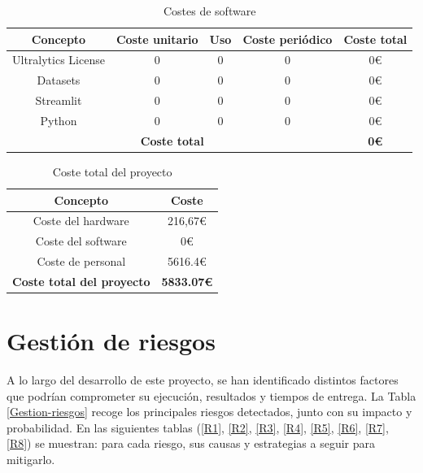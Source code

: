\documentclass[12pt,a4paper,onecolumn,oneside]{report}
\begin{document}
\begin{table}[ht]
    \centering
    \caption{Costes de software}
    \begin{tabular}{|c|c|c|c|c|}
        \hline
        \textbf{Concepto} & \textbf{Coste unitario} & \textbf{Uso} & \textbf{Coste periódico} & \textbf{Coste total}\\
        \hline
        Ultralytics License & 0 & 0 & 0 & 0€\\
        \hline
        Datasets & 0 & 0 & 0 & 0€\\
        \hline
        Streamlit & 0 & 0 & 0 & 0€\\
        \hline
        Python & 0 & 0 & 0 & 0€\\
        \hline
        \multicolumn{4}{|c|}{\textbf{Coste total}} & \textbf{0€}\\
        \hline
    \end{tabular}
    \label{Coste-SW}
\end{table}

\begin{table}[ht]
    \centering
    \caption{Coste total del proyecto}
    \begin{tabular}{|c|c|}
        \hline
        \textbf{Concepto} & \textbf{Coste}\\
        \hline
        Coste del hardware & 216,67€\\
        \hline
        Coste del software & 0€\\
        \hline
        Coste de personal & 5616.4€\\
        \hline
        {\textbf{Coste total del proyecto}} & \textbf{5833.07€}\\
        \hline
    \end{tabular}
    \label{Coste-Total}
\end{table}



\section{Gestión de riesgos}

A lo largo del desarrollo de este proyecto, se han identificado distintos factores que podrían comprometer su ejecución, resultados y tiempos de entrega.  La Tabla \ref{Gestion-riesgos} recoge los principales riesgos detectados, junto con su impacto y probabilidad. En las siguientes tablas (\ref{R1}, \ref{R2}, \ref{R3}, \ref{R4}, \ref{R5}, \ref{R6}, \ref{R7}, \ref{R8}) se muestran: para cada riesgo, sus causas y estrategias a seguir para mitigarlo.
\end{document}
